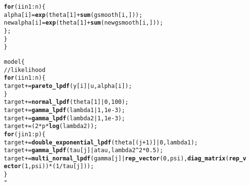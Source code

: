 \documentclass{article}\usepackage[]{graphicx}\usepackage[]{xcolor}
\makeatletter
\newcommand{\hlkwd}[1]{\textcolor[rgb]{0.737,0.353,0.396}{\textbf{#1}}}%
\newenvironment{kframe}{%
 \def\at@end@of@kframe{}%
 \ifinner\ifhmode%
  \def\at@end@of@kframe{\end{minipage}}%
  \begin{minipage}{\columnwidth}%
 \fi\fi%
 \def\FrameCommand##1{\hskip\@totalleftmargin \hskip-\fboxsep
 \colorbox{shadecolor}{##1}\hskip-\fboxsep
     \hskip-\linewidth \hskip-\@totalleftmargin \hskip\columnwidth}%
 \MakeFramed {\advance\hsize-\width
   \@totalleftmargin\z@ \linewidth\hsize
   \@setminipage}}%
 {\par\unskip\endMakeFramed%
 \at@end@of@kframe}
\newenvironment{knitrout}{}{} %
\makeatother
\begin{document}
\begin{knitrout}
\begin{kframe}
\begin{alltt}
      \hlkwd{for} (i in 1:n)\{
          alpha[i] = \hlkwd{exp}(theta[1] + \hlkwd{sum}(gsmooth[i,])); 
          newalpha[i] = \hlkwd{exp}(theta[1] + \hlkwd{sum}(newgsmooth[i,]));
      \};
    \}
\}

model \{
    // likelihood
    \hlkwd{for} (i in 1:n)\{
        target += \hlkwd{pareto_lpdf}(y[i] | u, alpha[i]);
    \}
    target += \hlkwd{normal_lpdf}(theta[1] | 0, 100);
    target += \hlkwd{gamma_lpdf}(lambda1 | 1, 1e-3);
    target += \hlkwd{gamma_lpdf}(lambda2 | 1, 1e-3);
    target += (2*p*\hlkwd{log}(lambda2));
    \hlkwd{for} (j in 1:p)\{
        target += \hlkwd{double_exponential_lpdf}(theta[(j+1)] | 0, lambda1);
        target += \hlkwd{gamma_lpdf}(tau[j] | atau, lambda2^2*0.5);
        target += \hlkwd{multi_normal_lpdf}(gamma[j] | \hlkwd{rep_vector}(0, psi), \hlkwd{diag_matrix}(\hlkwd{rep_vector}(1, psi)) * (1/tau[j]));
\}
"
\end{alltt}


{\ttfamily\noindent\bfseries{}}\end{kframe}
\end{knitrout}
\end{document}
